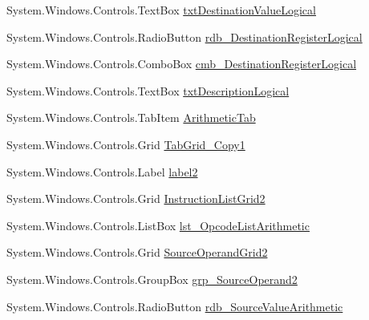 \begin{DoxyCompactItemize}
\item 
System.\+Windows.\+Controls.\+Text\+Box \hyperlink{class_c_p_u___o_s___simulator_1_1_instructions_window_af1a2860f125c3a8e25c73c1b04290438}{txt\+Destination\+Value\+Logical}
\item 
System.\+Windows.\+Controls.\+Radio\+Button \hyperlink{class_c_p_u___o_s___simulator_1_1_instructions_window_a3670f5971b586bd8977a78bcde185a35}{rdb\+\_\+\+Destination\+Register\+Logical}
\item 
System.\+Windows.\+Controls.\+Combo\+Box \hyperlink{class_c_p_u___o_s___simulator_1_1_instructions_window_aefcd87b5db00ac68e7d80ac5fddce8c5}{cmb\+\_\+\+Destination\+Register\+Logical}
\item 
System.\+Windows.\+Controls.\+Text\+Box \hyperlink{class_c_p_u___o_s___simulator_1_1_instructions_window_ae465810d61bb136b7934563cf85b3027}{txt\+Description\+Logical}
\item 
System.\+Windows.\+Controls.\+Tab\+Item \hyperlink{class_c_p_u___o_s___simulator_1_1_instructions_window_aabf61d7cbf8be85bb4ab0ef2d0614b46}{Arithmetic\+Tab}
\item 
System.\+Windows.\+Controls.\+Grid \hyperlink{class_c_p_u___o_s___simulator_1_1_instructions_window_a834965d0ae6a57edb71a818dca188a30}{Tab\+Grid\+\_\+\+Copy1}
\item 
System.\+Windows.\+Controls.\+Label \hyperlink{class_c_p_u___o_s___simulator_1_1_instructions_window_a237621e58e68c4a07cdf8803cc1614fd}{label2}
\item 
System.\+Windows.\+Controls.\+Grid \hyperlink{class_c_p_u___o_s___simulator_1_1_instructions_window_a33108da9779c5108fc5dd303a8d33454}{Instruction\+List\+Grid2}
\item 
System.\+Windows.\+Controls.\+List\+Box \hyperlink{class_c_p_u___o_s___simulator_1_1_instructions_window_a7445b276d3723f67ba564038940d44c5}{lst\+\_\+\+Opcode\+List\+Arithmetic}
\item 
System.\+Windows.\+Controls.\+Grid \hyperlink{class_c_p_u___o_s___simulator_1_1_instructions_window_a715ed01337540f316f39fe42c373c602}{Source\+Operand\+Grid2}
\item 
System.\+Windows.\+Controls.\+Group\+Box \hyperlink{class_c_p_u___o_s___simulator_1_1_instructions_window_ad37aae3614abd76749236a7739fbc18b}{grp\+\_\+\+Source\+Operand2}
\item 
System.\+Windows.\+Controls.\+Radio\+Button \hyperlink{class_c_p_u___o_s___simulator_1_1_instructions_window_a627e9cbe7e0cb2ce0f109f2345e19b73}{rdb\+\_\+\+Source\+Value\+Arithmetic}
\item 

\end{DoxyCompactItemize}
